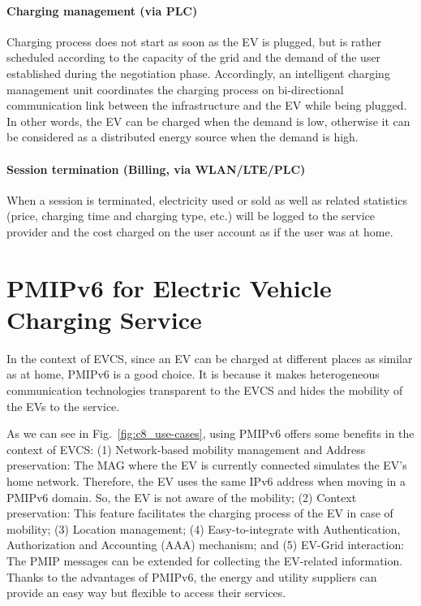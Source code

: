 \paragraph{Charging management (via PLC)} Charging process does not start as soon as the EV is plugged, but is rather scheduled according to the capacity of the grid and the demand of the user established during the negotiation phase. Accordingly, an intelligent charging management unit coordinates the charging process on bi-directional communication link between the infrastructure and the EV while being plugged. In other words, the EV can be charged when the demand is low, otherwise it can be considered as a distributed energy source when the demand is high.  
\paragraph{Session termination (Billing, via WLAN/LTE/PLC)} When a session is terminated, electricity used or sold as well as related statistics (price, charging time and charging type, etc.) will be logged to the service provider and the cost charged on the user account as if the user was at home. 

\section{PMIPv6 for Electric Vehicle Charging Service} \label{ch8:pmip}
In the context of EVCS, since an EV can be charged at different places as similar as at home, PMIPv6 is a good choice. It is because it makes heterogeneous communication technologies transparent to the EVCS and hides the mobility of the EVs to the service. 

As we can see in Fig.~\ref{fig:c8_use-cases}, using PMIPv6 offers some benefits in the context of EVCS: (1) Network-based mobility management and Address preservation: The MAG where the EV is currently connected simulates the EV's home network. Therefore, the EV uses the same IPv6 address when moving in a PMIPv6 domain. So, the EV is not aware of the mobility; (2) Context preservation: This feature facilitates the charging process of the EV in case of mobility; (3) Location management; (4) Easy-to-integrate with Authentication, Authorization and Accounting (AAA) mechanism; and (5) EV-Grid interaction: The PMIP messages can be extended for collecting the EV-related information. Thanks to the advantages of PMIPv6, the energy and utility suppliers can provide an easy way but flexible to access their services. 

